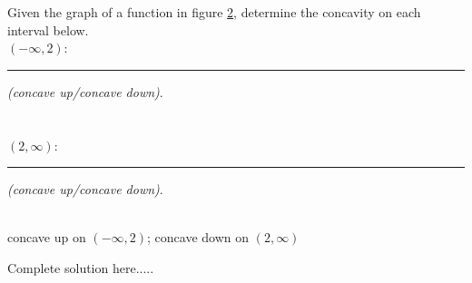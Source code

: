 \begin{figure}
\begin{figure}[H]
\center
\caption{}
\label{fig:MOM266454}
\vspace{-1cm}

\end{figure}
\end{figure}
\hfill \break
\vspace{-1cm}
\begin{example}
Given the graph of a function in figure \ref{fig:MOM266454}, determine the concavity on each interval below.\\
$(-\infty,2)$:\rule{2cm}{0.25mm} \emph{(concave up/concave down)}.\\\\\\
$(2,\infty)$:\rule{2.25cm}{0.25mm} \emph{(concave up/concave down)}.\\\\

    \begin{sol}
    concave up on $(-\infty,2)$; concave down on $(2,\infty)$
    \end{sol}
    \begin{solL}
    Complete solution here.....
    
    \end{solL}
    
\end{example}


